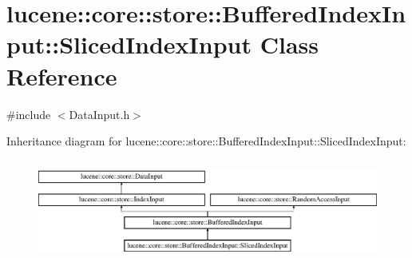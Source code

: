 \hypertarget{classlucene_1_1core_1_1store_1_1BufferedIndexInput_1_1SlicedIndexInput}{}\section{lucene\+:\+:core\+:\+:store\+:\+:Buffered\+Index\+Input\+:\+:Sliced\+Index\+Input Class Reference}
\label{classlucene_1_1core_1_1store_1_1BufferedIndexInput_1_1SlicedIndexInput}


{\ttfamily \#include $<$Data\+Input.\+h$>$}

Inheritance diagram for lucene\+:\+:core\+:\+:store\+:\+:Buffered\+Index\+Input\+:\+:Sliced\+Index\+Input\+:\begin{figure}[H]
\begin{center}
\leavevmode
\includegraphics[height=3.353293cm]{classlucene_1_1core_1_1store_1_1BufferedIndexInput_1_1SlicedIndexInput}
\end{center}
\end{figure}
